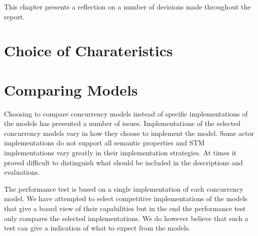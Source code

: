 \makeatletter {}\makeatother
{}
This chapter presents a reflection on a number of decisions made throughout the report.

\section{Choice of Charateristics}

\section{Comparing Models}
Choosing to compare concurrency models instead of specific implementations of the models has presented a number of issues. Implementations of the selected concurrency models vary in how they choose to implement the model. Some actor implementations do not support all semantic properties and \ac{STM} implementations vary greatly in their implementation strategies. At times it proved difficult to distinguish what should be included in the descriptions and evaluations. 

The performance test is based on a single implementation of each concurrency model. We have attempted to select competitive implementations of the models that give a board view of their capabilities but in the end the performance test only compares the selected implementations. We do however believe that such a test can give a indication of what to expect from the models.

